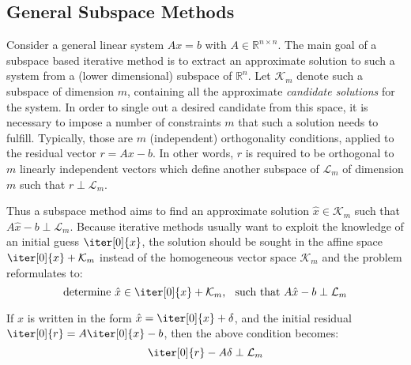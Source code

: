 \subsection{General Subspace Methods}
\label{sec:subspace_methods}

Consider a general linear system $Ax=b$ with $A \in \mathbb{R}^{n \times n}$. The main goal of a subspace based iterative method is to extract an approximate solution to such a system from a (lower dimensional) subspace of $\mathbb{R}^n$. Let $\mathcal{K}_m$ denote such a subspace of dimension $m$, containing all the approximate \textit{candidate solutions} for the system. In order to single out a desired candidate from this space, it is necessary to impose a number of constraints $m$ that such a solution needs to fulfill. Typically, those are $m$ (independent) orthogonality conditions, applied to the residual vector $r = Ax-b$. In other words, $r$ is required to be orthogonal to $m$ linearly independent vectors which define another subspace of $\mathcal{L}_m$ of dimension $m$ such that $r \perp \mathcal{L}_m$.

Thus a subspace method aims to find an approximate solution $\hat{x}\in \mathcal{K}_m$ such that $A\hat{x}-b \perp \mathcal{L}_m$. Because iterative methods usually want to exploit the knowledge of an initial guess $\iter[0]{x}$, the solution should be sought in the affine space $\iter[0]{x}+\mathcal{K}_m$ instead of the homogeneous vector space $\mathcal{K}_m$ \cite{saad_iterative_2003} and the problem reformulates to:
\begin{equation}
    \text{determine } \hat{x} \in \iter[0]{x}+\mathcal{K}_m\text{,}\;\;\text{  such that } A\hat{x}-b \perp \mathcal{L}_m
\end{equation}

\noindent If $\hat{x}$ is written in the form $\hat{x}=\iter[0]{x}+\delta$, and the initial residual $\iter[0]{r} = A\iter[0]{x}-b$, then the above condition becomes:
\begin{equation}
    \iter[0]{r} - A\delta \perp \mathcal{L}_m
\end{equation}

